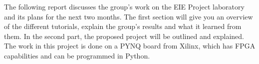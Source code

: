 The following report discusses the group’s work on the EIE Project laboratory and its plans for the next two months. The first section will give you an overview of the different tutorials, explain the group’s results and what it learned from them. In the second part, the proposed project will be outlined and explained. The work in this project is done on a PYNQ board from Xilinx, which has FPGA capabilities and can be programmed in Python.
